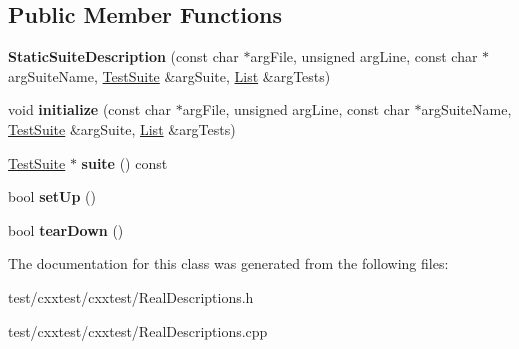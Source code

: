 \subsection*{Public Member Functions}
\begin{DoxyCompactItemize}
\item 
\hypertarget{classCxxTest_1_1StaticSuiteDescription_ae34af6e0f02c07367bd08a6aadc8cd3c}{{\bfseries Static\-Suite\-Description} (const char $\ast$arg\-File, unsigned arg\-Line, const char $\ast$arg\-Suite\-Name, \hyperlink{classCxxTest_1_1TestSuite}{Test\-Suite} \&arg\-Suite, \hyperlink{structCxxTest_1_1List}{List} \&arg\-Tests)}\label{classCxxTest_1_1StaticSuiteDescription_ae34af6e0f02c07367bd08a6aadc8cd3c}

\item 
\hypertarget{classCxxTest_1_1StaticSuiteDescription_a68a58cef0deb558f2ae42d5cc173b840}{void {\bfseries initialize} (const char $\ast$arg\-File, unsigned arg\-Line, const char $\ast$arg\-Suite\-Name, \hyperlink{classCxxTest_1_1TestSuite}{Test\-Suite} \&arg\-Suite, \hyperlink{structCxxTest_1_1List}{List} \&arg\-Tests)}\label{classCxxTest_1_1StaticSuiteDescription_a68a58cef0deb558f2ae42d5cc173b840}

\item 
\hypertarget{classCxxTest_1_1StaticSuiteDescription_a95e67e0837372e98747703ac70b575e7}{\hyperlink{classCxxTest_1_1TestSuite}{Test\-Suite} $\ast$ {\bfseries suite} () const }\label{classCxxTest_1_1StaticSuiteDescription_a95e67e0837372e98747703ac70b575e7}

\item 
\hypertarget{classCxxTest_1_1StaticSuiteDescription_ae5f5ef0c93d0c72b6dc3d50384d32729}{bool {\bfseries set\-Up} ()}\label{classCxxTest_1_1StaticSuiteDescription_ae5f5ef0c93d0c72b6dc3d50384d32729}

\item 
\hypertarget{classCxxTest_1_1StaticSuiteDescription_a76c248028af4e941970287e70ccdd936}{bool {\bfseries tear\-Down} ()}\label{classCxxTest_1_1StaticSuiteDescription_a76c248028af4e941970287e70ccdd936}

\end{DoxyCompactItemize}


The documentation for this class was generated from the following files\-:\begin{DoxyCompactItemize}
\item 
test/cxxtest/cxxtest/Real\-Descriptions.\-h\item 
test/cxxtest/cxxtest/Real\-Descriptions.\-cpp\end{DoxyCompactItemize}
